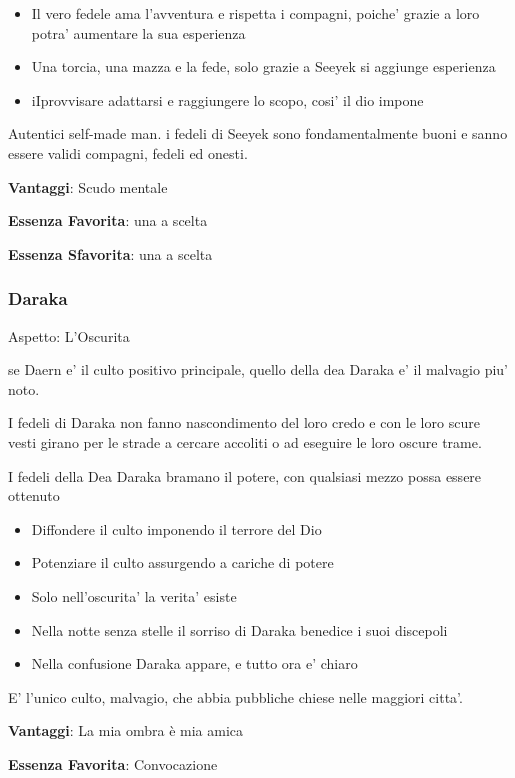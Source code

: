 \documentclass[a4paper,11pt,twoside,openany]{book}
\begin{document}
\begin{itemize}
	\item Il vero fedele ama l'avventura e rispetta i compagni, poiche' grazie a loro potra' aumentare la sua esperienza
	\item Una torcia, una mazza e la fede, solo grazie a Seeyek si aggiunge esperienza
	\item iIprovvisare adattarsi e raggiungere lo scopo, cosi' il dio impone
\end{itemize}

Autentici self-made man. i fedeli di Seeyek sono fondamentalmente buoni e sanno essere validi compagni, fedeli ed onesti.


\textbf{Vantaggi}: Scudo mentale

\textbf{Essenza Favorita}: una a scelta

\textbf{Essenza Sfavorita}: una a scelta
\bigskip

\subsubsection{Daraka}

Aspetto: L'Oscurita
\bigskip

se Daern e' il culto positivo principale, quello della dea Daraka e' il malvagio piu' noto.

I fedeli di Daraka non fanno nascondimento del loro credo e con le loro scure vesti girano per le strade a cercare accoliti o ad eseguire le loro oscure trame.


I fedeli della Dea Daraka bramano il potere, con qualsiasi mezzo possa essere ottenuto

\begin{itemize}
	\item Diffondere il culto imponendo il terrore del Dio
	\item Potenziare il culto assurgendo a cariche di potere
	\item Solo nell'oscurita' la verita' esiste
	\item Nella notte senza stelle il sorriso di Daraka benedice i suoi discepoli
	\item Nella confusione Daraka appare, e tutto ora e' chiaro
\end{itemize}


E' l'unico culto, malvagio, che abbia pubbliche chiese nelle maggiori citta'.


\textbf{Vantaggi}: La mia ombra è mia amica

\textbf{Essenza Favorita}: Convocazione
\end{document}
